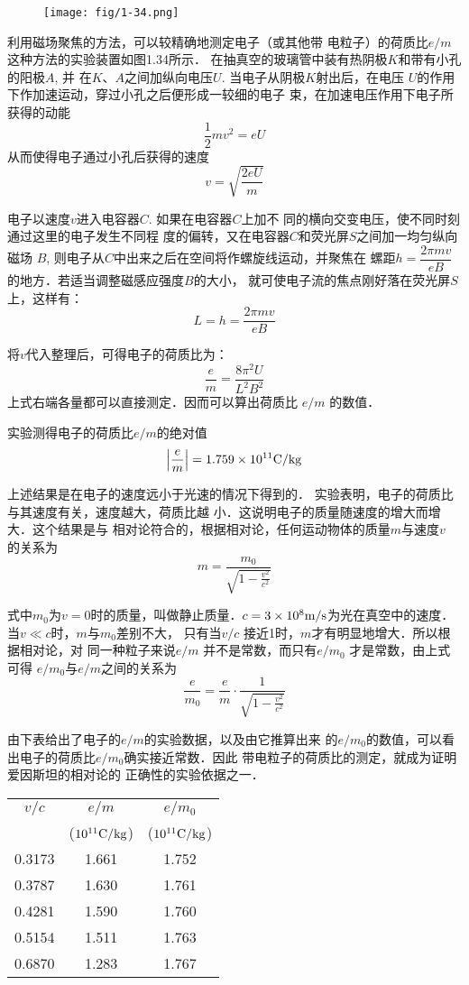 \begin{figure}[htp]
    \centering
    \texttt{[image: fig/1-34.png]}
    \caption{}
\end{figure}

利用磁场聚焦的方法，可以较精确地测定电子（或其他带
电粒子）的荷质比$e/m$
这种方法的实验装置如图1.34所示．
在抽真空的玻璃管中装有热阴极$K$和带有小孔的阳极$A$, 并
在$K$、$A$之间加纵向电压$U$. 当电子从阴极$K$射出后，在电压
$U$的作用下作加速运动，穿过小孔之后便形成一较细的电子
束，在加速电压作用下电子所获得的动能
\[\frac{1}{2}mv^2=eU\]
从而使得电子通过小孔后获得的速度
\[v=\sqrt{\frac{2eU}{m}}\]

电子以速度$v$进入电容器$C$. 如果在电容器$C$上加不
同的横向交变电压，使不同时刻通过这里的电子发生不同程
度的偏转，又在电容器$C$和荧光屏$S$之间加一均匀纵向磁场
$B$, 则电子从$C$中出来之后在空间将作螺旋线运动，并聚焦在
螺距$h=\dfrac{2\pi mv}{eB}$
的地方．若适当调整磁感应强度$B$的大小，
就可使电子流的焦点刚好落在荧光屏$S$上，这样有：
\[L=h=\frac{2\pi mv}{eB}\]

将$v$代入整理后，可得电子的荷质比为：
\[\frac{e}{m}=\frac{8\pi^2 U}{L^2B^2}\]
上式右端各量都可以直接测定．因而可以算出荷质比
$e/m$
的数值．

实验测得电子的荷质比$e/m$的绝对值
\[\left|\frac{e}{m}\right|=1.759\times10^{11}{\rm C/kg}\]

上述结果是在电子的速度远小于光速的情况下得到的．
实验表明，电子的荷质比与其速度有关，速度越大，荷质比越
小．这说明电子的质量随速度的增大而增大．这个结果是与
相对论符合的，根据相对论，任何运动物体的质量$m$与速度$v$
的关系为
\[m=\frac{m_0}{\sqrt{1-\frac{v^2}{c^2}}}\]

式中$m_0$为$v=0$时的质量，叫做静止质量．$c=3\times10^8\text{m}/\text{s}$为光在真空中的速度．当$v\ll c$时，$m$与$m_0$差别不大，
只有当$v/c$
接近1时，$m$才有明显地增大．所以根据相对论，对
同一种粒子来说$e/m$
并不是常数，而只有$e/m_0$
才是常数，由上式可得
$e/m_0$与$e/m$之间的关系为
\[\frac{e}{m_0}=\frac{e}{m}\cdot \frac{1}{\sqrt{1-\frac{v^2}{c^2}}}\]

由下表给出了电子的$e/m$的实验数据，以及由它推算出来
的$e/m_0$的数值，可以看出电子的荷质比$e/m_0$确实接近常数．因此
带电粒子的荷质比的测定，就成为证明爱因斯坦的相对论的
正确性的实验依据之一．

\begin{center}
    \begin{tabular}{ccc}
\hline
$v/c$  &  $e/m$ &  $e/m_0$ \\
&(${\rm 10^{11}C/kg}$)&(${\rm 10^{11}C/kg}$)\\
\hline
0.3173&1.661&1.752\\
0.3787&1.630&1.761\\
0.4281&1.590&1.760\\
0.5154&1.511&1.763\\
0.6870&1.283&1.767\\
\hline
    \end{tabular}
\end{center}







